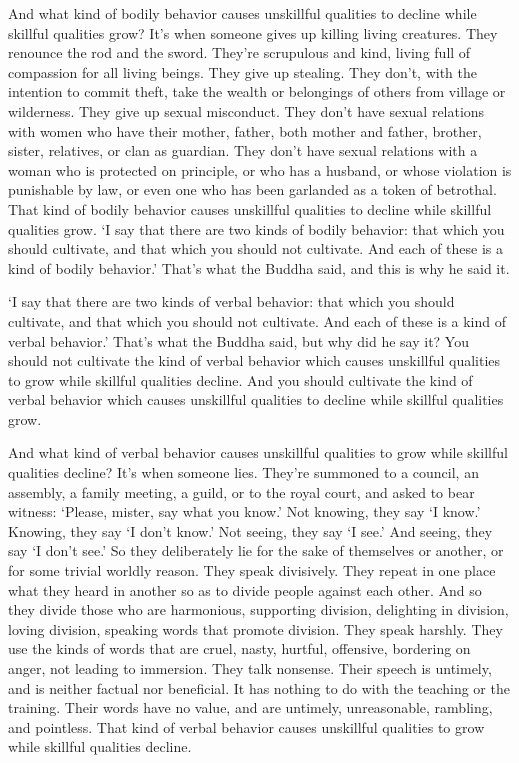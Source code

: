 \documentclass[12pt,openany]{book}%
\begin{document}
And what kind of bodily behavior causes unskillful qualities to decline while skillful qualities grow? It’s when someone gives up killing living creatures. They renounce the rod and the sword. They’re scrupulous and kind, living full of compassion for all living beings. They give up stealing. They don’t, with the intention to commit theft, take the wealth or belongings of others from village or wilderness. They give up sexual misconduct. They don’t have sexual relations with women who have their mother, father, both mother and father, brother, sister, relatives, or clan as guardian. They don’t have sexual relations with a woman who is protected on principle, or who has a husband, or whose violation is punishable by law, or even one who has been garlanded as a token of betrothal. That kind of bodily behavior causes unskillful qualities to decline while skillful qualities grow. ‘I say that there are two kinds of bodily behavior: that which you should cultivate, and that which you should not cultivate. And each of these is a kind of bodily behavior.’ That’s what the Buddha said, and this is why he said it. 

‘I say that there are two kinds of verbal behavior: that which you should cultivate, and that which you should not cultivate. And each of these is a kind of verbal behavior.’ That’s what the Buddha said, but why did he say it? You should not cultivate the kind of verbal behavior which causes unskillful qualities to grow while skillful qualities decline. And you should cultivate the kind of verbal behavior which causes unskillful qualities to decline while skillful qualities grow. 

And what kind of verbal behavior causes unskillful qualities to grow while skillful qualities decline? It’s when someone lies. They’re summoned to a council, an assembly, a family meeting, a guild, or to the royal court, and asked to bear witness: ‘Please, mister, say what you know.’ Not knowing, they say ‘I know.’ Knowing, they say ‘I don’t know.’ Not seeing, they say ‘I see.’ And seeing, they say ‘I don’t see.’ So they deliberately lie for the sake of themselves or another, or for some trivial worldly reason. They speak divisively. They repeat in one place what they heard in another so as to divide people against each other. And so they divide those who are harmonious, supporting division, delighting in division, loving division, speaking words that promote division. They speak harshly. They use the kinds of words that are cruel, nasty, hurtful, offensive, bordering on anger, not leading to immersion. They talk nonsense. Their speech is untimely, and is neither factual nor beneficial. It has nothing to do with the teaching or the training. Their words have no value, and are untimely, unreasonable, rambling, and pointless. That kind of verbal behavior causes unskillful qualities to grow while skillful qualities decline. 
\end{document}

